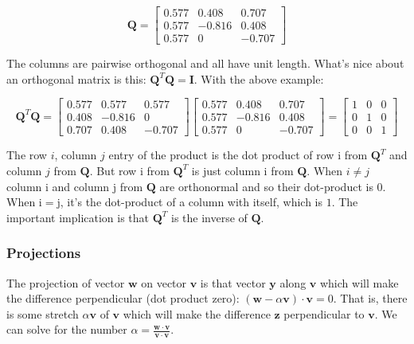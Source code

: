 \documentclass[main.tex]{subfiles}
\begin{document}
    $$
    \mathbf{Q}=\left[\begin{array}{ccc}
    0.577 & 0.408 & 0.707 \\
    0.577 & -0.816 & 0.408 \\
    0.577 & 0 & -0.707
    \end{array}\right]
    $$
    
    The columns are pairwise orthogonal and all have unit length. What's nice about an orthogonal matrix is this: $\mathbf{Q}^{T} \mathbf{Q}=\mathbf{I}$. With the above example: 
    
    $$
    \mathbf{Q}^{T} \mathbf{Q}=\left[\begin{array}{ccc}
    0.577 & 0.577 & 0.577 \\
    0.408 & -0.816 & 0 \\
    0.707 & 0.408 & -0.707
    \end{array}\right]\left[\begin{array}{ccc}
    0.577 & 0.408 & 0.707 \\
    0.577 & -0.816 & 0.408 \\
    0.577 & 0 & -0.707
    \end{array}\right]=\left[\begin{array}{lll}
    1 & 0 & 0 \\
    0 & 1 & 0 \\
    0 & 0 & 1
    \end{array}\right]
    $$
    
    The row $i$, column $j$ entry of the product is the dot product of row i from $\mathbf{Q}^{T}$ and column $j$ from $\mathbf{Q}$. But row i from $\mathbf{Q}^{T}$ is just column i from $\mathbf{Q}$. When $i \neq j$ column i and column j from $\mathbf{Q}$ are orthonormal and so their dot-product is 0. When $\mathrm{i}=\mathrm{j}$, it's the dot-product of a column with itself, which is $1$. The important implication is that $\mathbf{Q}^{T}$ is the inverse of $\mathbf{Q}$.
    
    \subsubsection{Projections}
    
    The projection of vector $\mathbf{w}$ on vector $\mathbf{v}$ is that vector $\mathbf{y}$ along $\mathbf{v}$ which will make the difference perpendicular (dot product zero): $(\mathbf{w}-\alpha \mathbf{v}) \cdot \mathbf{v}=0$. That is, there is some stretch $\alpha \mathbf{v}$ of $\mathbf{v}$ which will make the difference $\mathbf{z}$ perpendicular to $\mathbf{v}$. We can solve for the number $\alpha=\frac{\mathbf{w} \cdot \mathbf{v}}{\mathbf{v} \cdot \mathbf{v}}$. \\
    
\end{document}
